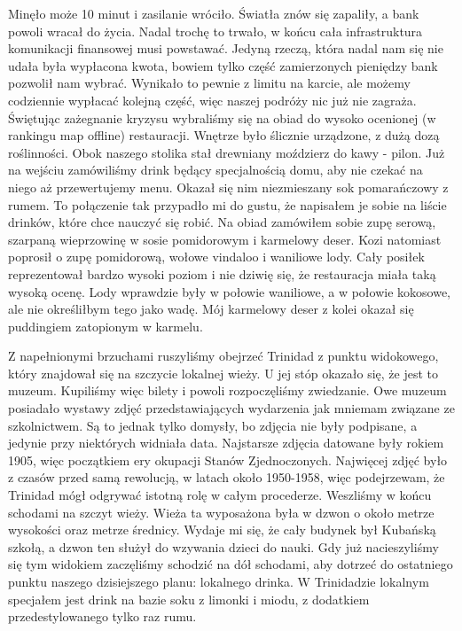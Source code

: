 Minęło może 10 minut i zasilanie wróciło.
Światła znów się zapaliły, a bank powoli wracał do życia.
Nadal trochę to trwało, w końcu cała infrastruktura komunikacji finansowej musi powstawać.
Jedyną rzeczą, która nadal nam się nie udała była wypłacona kwota, bowiem tylko część zamierzonych pieniędzy bank pozwolił nam wybrać. Wynikało to pewnie z limitu na karcie, ale możemy codziennie wypłacać kolejną część, więc naszej podróży nic już nie zagraża.
Świętując zażegnanie kryzysu wybraliśmy się na obiad do wysoko ocenionej (w rankingu map offline) restauracji.
Wnętrze było ślicznie urządzone, z dużą dozą roślinności.
Obok naszego stolika stał drewniany moździerz do kawy - pilon.
Już na wejściu zamówiliśmy drink będący specjalnością domu, aby nie czekać na niego aż przewertujemy menu.
Okazał się nim niezmieszany sok pomarańczowy z rumem.
To połączenie tak przypadło mi do gustu, że napisałem je sobie na liście drinków, które chce nauczyć się robić.
Na obiad zamówiłem sobie zupę serową, szarpaną wieprzowinę w sosie pomidorowym i karmelowy deser.
Kozi natomiast poprosił o zupę pomidorową, wołowe vindaloo i waniliowe lody.
Cały posiłek reprezentował bardzo wysoki poziom i nie dziwię się, że restauracja miała taką wysoką ocenę.
Lody wprawdzie były w połowie waniliowe, a w połowie kokosowe, ale nie określiłbym tego jako wadę.
Mój karmelowy deser z kolei okazał się puddingiem zatopionym w karmelu.
\par Z napełnionymi brzuchami ruszyliśmy obejrzeć Trinidad z punktu widokowego, który znajdował się na szczycie lokalnej wieży.
U jej stóp okazało się, że jest to muzeum.
Kupiliśmy więc bilety i powoli rozpoczęliśmy zwiedzanie.
Owe muzeum posiadało wystawy zdjęć przedstawiających wydarzenia jak mniemam związane ze szkolnictwem.
Są to jednak tylko domysły, bo zdjęcia nie były podpisane, a jedynie przy niektórych widniała data.
Najstarsze zdjęcia datowane były rokiem 1905, więc początkiem ery okupacji Stanów Zjednoczonych.
Najwięcej zdjęć było z czasów przed samą rewolucją, w latach około 1950-1958, więc podejrzewam, że Trinidad mógł odgrywać istotną rolę w całym procederze.
Weszliśmy w końcu schodami na szczyt wieży.
Wieża ta wyposażona była w dzwon o około metrze wysokości oraz metrze średnicy.
Wydaje mi się, że cały budynek był Kubańską szkołą, a dzwon ten służył do wzywania dzieci do nauki.
Gdy już nacieszyliśmy się tym widokiem zaczęliśmy schodzić na dół schodami, aby dotrzeć do ostatniego punktu naszego dzisiejszego planu: lokalnego drinka.
W Trinidadzie lokalnym specjałem jest drink na bazie soku z limonki i miodu, z dodatkiem przedestylowanego tylko raz rumu.
